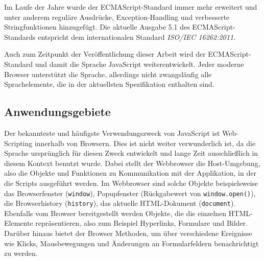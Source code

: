 Im Laufe der Jahre wurde der ECMAScript-Standard immer mehr erweitert und unter anderem reguläre
Ausdrücke, Exception-Handling und verbesserte Stringfunktionen hinzugefügt. Die aktuelle Ausgabe 5.1
des ECMAScript-Standards entspricht dem internationalen Standard \emph{ISO/IEC 16262:2011}.
\citep{ecmascript}

Auch zum Zeitpunkt der Veröffentlichung dieser Arbeit wird der ECMAScript-Standard und damit die
Sprache JavaScript weiterentwickelt. Jeder moderne Browser unterstützt die Sprache, allerdings
nicht zwangsläufig alle Sprachelemente, die in der aktuellsten Spezifikation enthalten sind.


\subsection{Anwendungsgebiete}

Der bekannteste und häufigste Verwendungszweck von JavaScript ist Web-Scripting innerhalb von
Browsern. Dies ist nicht weiter verwunderlich ist, da die Sprache ursprünglich für diesen Zweck
entwickelt und lange Zeit ausschließlich in diesem Kontext benutzt wurde. Dabei stellt der
Webbrowser die Host-Umgebung, also die Objekte und Funktionen zu Kommunikation mit der Applikation,
in der die Scripts ausgeführt werden. Im Webbrowser sind solche Objekte beispielsweise das
Browserfenster (\lstinline{window}), Popupfenster (Rückgabewert von \lstinline{window.open()}),
die Browserhistory (\lstinline{history}), das aktuelle HTML-Dokument (\lstinline{document}).
Ebenfalls vom Browser bereitgestellt werden Objekte, die die einzelnen HTML-Elemente repräsentieren,
also zum Beispiel Hyperlinks, Formulare und Bilder. Darüber hinaus bietet der Browser Methoden, um
über verschiedene Ereignisse wie Klicks, Mausbewegungen und Änderungen an Formularfeldern
benachrichtigt zu werden.
\citep[Kap. 4.1]{ecmascript}

